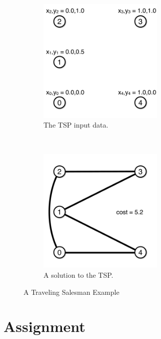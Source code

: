 \documentclass[11pt]{article}
\begin{document}
\begin{figure}[h]
        \centering
        \begin{subfigure}[b]{8.0cm}%
                \centering
                \includegraphics[width=6cm]{figures/tsp_1.pdf}
                \caption{The TSP input data.}
                \label{fig:vrp:input}
        \end{subfigure}%
        ~ %
        \hfill
        \begin{subfigure}[b]{8.0cm}
                \centering
                \includegraphics[width=6cm]{figures/tsp_2.pdf}
                \caption{A solution to the TSP.}
                \label{fig:vrp:sol}
        \end{subfigure}
        \caption{A Traveling Salesman Example}\label{fig:tsp}
\end{figure}

\section{Assignment}
\end{document}
